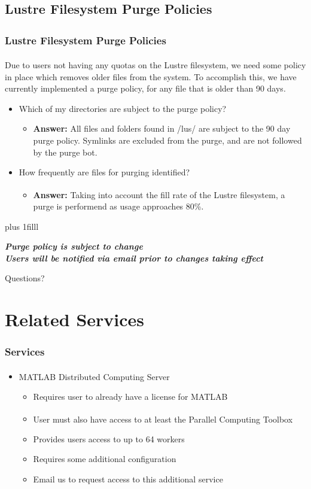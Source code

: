 \documentclass[t,hyperref={pdfpagelabels=false}]{beamer}
\newcommand{\ctilde}{{\fontfamily{ptm}\selectfont\texttildelow}}
\newcommand{\trademark}{\fontsize{5}{6}\selectfont \textsuperscript{\texttrademark}}
\newcommand{\regtrademark}{\fontsize{5}{6}\selectfont \textsuperscript{\textregistered}}
\newcommand{\btVFill}{\vskip0pt plus 1filll}
\newcommand{\lustre}{Lustre{\regtrademark}}
\begin{document}
\subsection{Lustre Filesystem Purge Policies}
\begin{frame}
\frametitle{{\lustre} Filesystem Purge Policies}
Due to users not having any quotas on the {\lustre} filesystem, we need some policy in place which removes older files from the system.  To accomplish this, we have currently implemented a purge policy, for any file that is older than 90 days.
\begin{itemize}
 \item Which of my directories are subject to the purge policy?
   \begin{itemize}
   \item \textbf{Answer:} All files and folders found in \ctilde/lus/ are subject to the 90 day purge policy.  Symlinks are excluded from the purge, and are not followed by the purge bot.  
   \end{itemize}
\item How frequently are files for purging identified?
   \begin{itemize}
   \item \textbf{Answer:} Taking into account the fill rate of the {\lustre} filesystem, a purge is performend as usage approaches 80\%.
   \end{itemize}
\end{itemize}
\btVFill
\begin{center}
\footnotesize \textbf{\emph{Purge policy is subject to change~\\Users will be notified via email prior to changes taking effect}}
\end{center}
\end{frame}


\begin{frame}
\Huge{\centerline{Questions?}}
\end{frame}


\section{Related Services}
\begin{frame}
\frametitle{Services}
\begin{itemize}
\item MATLAB Distributed Computing Server{\trademark}
  \begin{itemize}
    \item Requires user to already have a license for MATLAB
    \item User must also have access to at least the Parallel Computing Toolbox{\trademark}
    \item Provides users access to up to 64 workers
    \item Requires some additional configuration
    \item Email us to request access to this additional service
  \end{itemize}
\end{itemize}
\end{frame}
\end{document}
